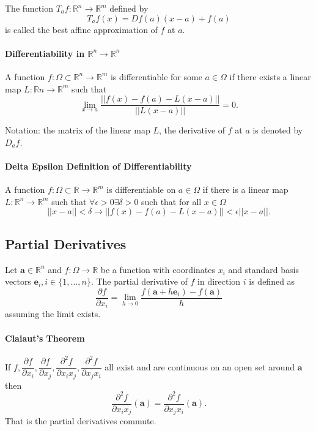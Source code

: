The function \(T_af:\mathbb{R}^n \to \mathbb{R}^m\) defined by 
\[T_af(x) = Df(a)(x-a) + f(a)\] is called the best affine approximation of \(f\) at \(a\).

\paragraph{Differentiability in \(\mathbb{R}^n\to \mathbb{R}^n\)}

A function \(f: \Omega\subset \mathbb{R}^n \to \mathbb{R}^m\) is differentiable for some
\(a\in\Omega\) if there exists a linear map \(L: \mathbb{R}n\to \mathbb{R}^m\)
such that
\[
\lim_{x\to a} \frac{
    \left|\left|f(x) - f(a) -L(x-a)\right|\right|
} {
    \left|\left|L(x-a)\right|\right|
} = 0.
\]

Notation: the matrix of the linear map \(L\), the derivative of \(f\) at
\(a\) is denoted by \(D_af\).

\paragraph{Delta Epsilon Definition of Differentiability}
A function \(f: \Omega\subset \mathbb{R}\to \mathbb{R}^m\) is 
differentiable on \(a\in \Omega\) if there is a linear map \(L: \mathbb{R}^n\to \mathbb{R}^m\)
such that \(\forall \epsilon > 0 \exists \delta > 0 \)
such that for all \(x\in \Omega\)
\[
\left|\left|x - a\right|\right| < \delta
\to
\left|\left|f(x) - f(a) - L(x-a)\right|\right|
< \epsilon\left|\left|x - a\right|\right|. 
\]

\subsection{Partial Derivatives}
Let \(\textbf{a}\in\mathbb{R}^n\) and \(f:\Omega\to\mathbb{R}\) be a function with 
coordinates \(x_i\) and standard basis vectors \(\textbf{e}_i, i\in \{1,\dots,n\}\).
The partial derivative of \(f\) in direction \(i\) is defined as
\[
    \frac{\partial f}{\partial x_i} = \lim_{h\to 0} 
    \frac{f(\textbf{a}+h\textbf{e}_i) -f(\textbf{a})}{h}
\]
assuming the limit exists.

\paragraph{Claiaut's Theorem}
 If 
 \(f, \dfrac{\partial f}{\partial x_i}, \dfrac{\partial f}{\partial x_j}, \dfrac{\partial^2 f}{\partial x_i x_j}, \dfrac{\partial^2 f}{\partial x_j x_i}\) all exist and are continuous on
 an open set around \(\textbf{a}\) then
 \[\frac{\partial^2 f}{\partial x_i x_j}(\textbf{a})=\frac{\partial^2 f}{\partial x_j x_i }(\textbf{a}).\]
 That is the partial derivatives commute.

